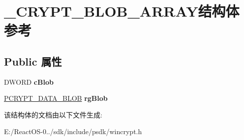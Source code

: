 \hypertarget{struct___c_r_y_p_t___b_l_o_b___a_r_r_a_y}{}\section{\+\_\+\+C\+R\+Y\+P\+T\+\_\+\+B\+L\+O\+B\+\_\+\+A\+R\+R\+A\+Y结构体 参考}
\label{struct___c_r_y_p_t___b_l_o_b___a_r_r_a_y}
\subsection*{Public 属性}
\begin{DoxyCompactItemize}
\item 
\mbox{\label{struct___c_r_y_p_t___b_l_o_b___a_r_r_a_y_ae95f442ebef31c358cc3e8ab11ed36d5}} 
D\+W\+O\+RD {\bfseries c\+Blob}
\item 
\mbox{\label{struct___c_r_y_p_t___b_l_o_b___a_r_r_a_y_a7a5badcb1c3f2dc6a5c6964b5cd6ce3d}} 
\hyperlink{struct___c_r_y_p_t_o_a_p_i___b_l_o_b}{P\+C\+R\+Y\+P\+T\+\_\+\+D\+A\+T\+A\+\_\+\+B\+L\+OB} {\bfseries rg\+Blob}
\end{DoxyCompactItemize}


该结构体的文档由以下文件生成\+:\begin{DoxyCompactItemize}
\item 
E\+:/\+React\+O\+S-\/0../sdk/include/psdk/wincrypt.\+h\end{DoxyCompactItemize}
